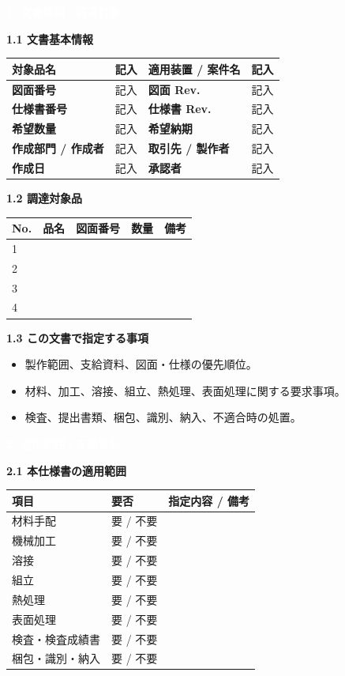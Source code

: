 \documentclass[a4paper,10pt]{ltjsarticle}
\makeatletter
\newlength{\SpecBodyWidth}
\newcommand{\SpecNo}{記入}
\newcommand{\SpecRev}{記入}
\newcommand{\SpecDate}{記入}
\newcommand{\ProjectName}{記入}
\newcommand{\PartName}{記入}
\newcommand{\DrawingNo}{記入}
\newcommand{\Quantity}{記入}
\newcommand{\DueDate}{記入}
\newcommand{\PageTitle}[1]{%
  \vspace*{2mm}%
  \noindent\colorbox{SpecHead}{%
    \parbox{\dimexpr\SpecBodyWidth-2\fboxsep\relax}{%
      \large\bfseries\textcolor{white}{#1}%
    }%
  }%
  \par\vspace{5mm}%
}
\newcommand{\BlockTitle}[1]{%
  \vspace{4mm}%
  \noindent\colorbox{SpecSoft}{%
    \parbox{\dimexpr\SpecBodyWidth-2\fboxsep\relax}{%
      \normalsize\bfseries\textcolor{SpecHead}{#1}%
    }%
  }%
  \par\vspace{1.5mm}%
}
\newenvironment{SpecTable}[1]{%
  \par\vspace{1mm}%
  \noindent\footnotesize%
  \renewcommand{\arraystretch}{1.10}%
  \setlength{\tabcolsep}{3.0pt}%
  \begin{tabular*}{\SpecBodyWidth}{@{\extracolsep{\fill}}#1@{}}%
}{%
  \end{tabular*}%
  \par\vspace{1.5mm}%
}
\newcommand{\Head}[1]{\textbf{\textcolor{SpecHead}{#1}}}
\newcommand{\Lab}[1]{\textbf{\textcolor{SpecHead}{#1}}}
\newcommand{\YN}{要 / 不要}
\makeatother
\begin{document}

\PageTitle{1. 文書情報・調達対象}

\BlockTitle{1.1 文書基本情報}
\begin{SpecTable}{|p{28mm}|p{43mm}|p{30mm}|p{43mm}|}
\hline
\Lab{対象品名} & \PartName & \Lab{適用装置 / 案件名} & \ProjectName \\
\hline
\Lab{図面番号} & \DrawingNo & \Lab{図面 Rev.} & 記入 \\
\hline
\Lab{仕様書番号} & \SpecNo & \Lab{仕様書 Rev.} & \SpecRev \\
\hline
\Lab{希望数量} & \Quantity & \Lab{希望納期} & \DueDate \\
\hline
\Lab{作成部門 / 作成者} & 記入 & \Lab{取引先 / 製作者} & 記入 \\
\hline
\Lab{作成日} & \SpecDate & \Lab{承認者} & 記入 \\
\hline
\end{SpecTable}

\BlockTitle{1.2 調達対象品}
\begin{SpecTable}{|p{9mm}|p{52mm}|p{35mm}|p{16mm}|p{34mm}|}
\hline
\Head{No.} & \Head{品名} & \Head{図面番号} & \Head{数量} & \Head{備考} \\
\hline
1 &  &  &  &  \\
\hline
2 &  &  &  &  \\
\hline
3 &  &  &  &  \\
\hline
4 &  &  &  &  \\
\hline
\end{SpecTable}

\BlockTitle{1.3 この文書で指定する事項}
\begin{itemize}
  \item 製作範囲、支給資料、図面・仕様の優先順位。
  \item 材料、加工、溶接、組立、熱処理、表面処理に関する要求事項。
  \item 検査、提出書類、梱包、識別、納入、不適合時の処置。
\end{itemize}

\clearpage

\PageTitle{2. 適用範囲・支給資料}

\BlockTitle{2.1 本仕様書の適用範囲}
\begin{SpecTable}{|p{36mm}|p{24mm}|p{86mm}|}
\hline
\Head{項目} & \Head{要否} & \Head{指定内容 / 備考} \\
\hline
材料手配 & \YN &  \\
\hline
機械加工 & \YN &  \\
\hline
溶接 & \YN &  \\
\hline
組立 & \YN &  \\
\hline
熱処理 & \YN &  \\
\hline
表面処理 & \YN &  \\
\hline
検査・検査成績書 & \YN &  \\
\hline
梱包・識別・納入 & \YN &  \\
\hline
\end{SpecTable}
\end{document}
